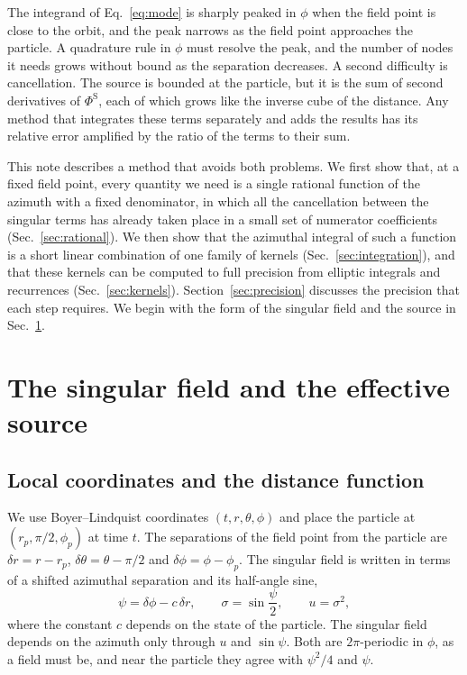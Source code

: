 \documentclass[11pt]{article}
\newcommand{\PhiS}{\Phi^{\mathrm{S}}}
\begin{document}
The integrand of Eq.~\eqref{eq:mode} is sharply peaked in $\phi$ when the field
point is close to the orbit, and the peak narrows as the field point approaches
the particle. A quadrature rule in $\phi$ must resolve the peak, and the number
of nodes it needs grows without bound as the separation decreases. A second
difficulty is cancellation. The source is bounded at the particle, but it is
the sum of second derivatives of $\PhiS$, each of which grows like the inverse
cube of the distance. Any method that integrates these terms separately and
adds the results has its relative error amplified by the ratio of the terms to
their sum.

This note describes a method that avoids both problems. We first show that, at
a fixed field point, every quantity we need is a single rational function of
the azimuth with a fixed denominator, in which all the cancellation between the
singular terms has already taken place in a small set of numerator
coefficients (Sec.~\ref{sec:rational}). We then show that the azimuthal
integral of such a function is a short linear combination of one family of
kernels (Sec.~\ref{sec:integration}), and that these kernels can be computed
to full precision from elliptic integrals and recurrences
(Sec.~\ref{sec:kernels}). Section~\ref{sec:precision} discusses the precision
that each step requires. We begin with the form of the singular field and the
source in Sec.~\ref{sec:field}.

\section{The singular field and the effective source}
\label{sec:field}

\subsection{Local coordinates and the distance function}

We use Boyer--Lindquist coordinates $(t,r,\theta,\phi)$ and place the particle
at $(r_p,\pi/2,\phi_p)$ at time $t$. The separations of the field point from
the particle are $\delta r=r-r_p$, $\delta\theta=\theta-\pi/2$ and
$\delta\phi=\phi-\phi_p$. The singular field is written in terms of a shifted
azimuthal separation and its half-angle sine,
\begin{equation}
  \label{eq:psi}
  \psi = \delta\phi - c\,\delta r, \qquad \sigma=\sin\frac{\psi}{2}, \qquad u=\sigma^2,
\end{equation}
where the constant $c$ depends on the state of the particle. The singular field
depends on the azimuth only through $u$ and $\sin\psi$. Both are
$2\pi$-periodic in $\phi$, as a field must be, and near the particle they agree
with $\psi^2/4$ and $\psi$.
\end{document}

